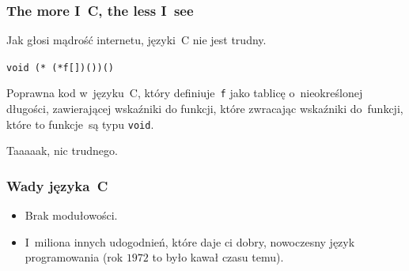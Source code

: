 \documentclass[10pt,t]{beamer}
\begin{document}
\begin{frame}
  \frametitle{The more I~C, the less I~see}


  Jak głosi mądrość internetu, języki~C nie jest trudny.

  \texttt{void (* (*f[])())()}

  Poprawna kod w~języku~C, który definiuje~\texttt{f} jako tablicę
  o~nieokreślonej długości, zawierającej wskaźniki do funkcji, które
  zwracając wskaźniki do~funkcji, które to funkcje~są typu \texttt{void}.

  Taaaaak, nic trudnego.








\end{frame}





\begin{frame}
  \frametitle{Wady języka~C}


  \begin{itemize}




  \item Brak modułowości.

  \item I~miliona innych udogodnień, które daje ci dobry, nowoczesny język
    programowania (rok $1972$ to było kawał czasu temu).

  \end{itemize}

\end{frame}
\end{document}
